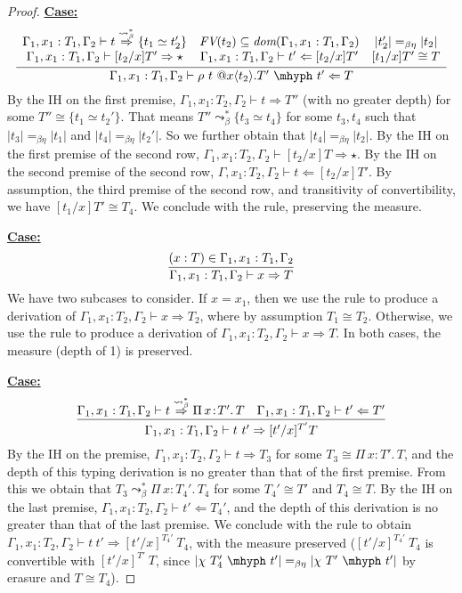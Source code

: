 \documentclass{article}
\newcommand{\abs}[4]{{#1}\, #2\! : \! #3.\, #4}
\newcommand{\tpcheck}[0]{\Leftarrow}
\newcommand{\tpsynth}[0]{\Rightarrow}
\newcommand{\tpsynthleads}[0]{\ensuremath{\overset{\leadsto_\beta^*}{\Rightarrow}}}
\newcommand{\startcase}[1]{\vspace{#1} \noindent\textbf{\underline{Case:}}}
\begin{document}
\begin{proof}
  \startcase{.2cm}
  \[
  \infer{\Gamma_1,x_1:T_1,\Gamma_2 \vdash \rho\ t\ @x\langle t_2 \rangle.T'\ \mhyph\ t' \tpcheck T}
  {
    \begin{array}{ccc}
      \Gamma_1,x_1:T_1,\Gamma_2 \vdash t \tpsynthleads \{t_1 \simeq t_2'\}
      & \textit{FV}(t_2) \subseteq \textit{dom}(\Gamma_1,x_1:T_1,\Gamma_2)
      & |t_2'| =_{\beta\eta} |t_2|
      \\ \Gamma_1,x_1:T_1,\Gamma_2 \vdash [t_2/x] T' \tpsynth \star
      & \Gamma_1,x_1:T_1,\Gamma_2 \vdash t' \tpcheck [t_2/x]T'
      & [t_1/x]T' \cong T
    \end{array}
  }
  \]
  By the IH on the first premise, \(\Gamma_1,x_1:T_2,\Gamma_2 \vdash t \tpsynth
  T''\) (with no greater depth) for some \(T'' \cong \{t_1 \simeq t_2'\}\).
  That means \(T'' \leadsto_\beta^* \{t_3 \simeq t_4\}\) for some \(t_3,t_4\)
  such that \(|t_3| =_{\beta\eta} |t_1|\) and \(|t_4| =_{\beta\eta} |t_2'|\).
  So we further obtain that \(|t_4| =_{\beta\eta} |t_2|\).
  By the IH on the first premise of the second row, \(\Gamma_1,x_1:T_2,\Gamma_2
  \vdash [t_2/x]T \tpsynth \star\).
  By the IH on the second premise of the second row, \(\Gamma,x_1:T_2,\Gamma_2
  \vdash t \tpcheck [t_2/x]T'\).
  By assumption, the third premise of the second row, and transitivity of
  convertibility, we have \([t_1/x]T' \cong T_4\).
  We conclude with the rule, preserving the measure.
  
  \startcase{.2cm}
  \[
    \infer{
      \Gamma_1,x_1:T_1,\Gamma_2 \vdash x \tpsynth T
    }{
      (x : T)\in\Gamma_1,x_1:T_1,\Gamma_2
    }
  \]
  We have two subcases to consider.
  If \(x = x_1\), then we use the rule to produce a derivation of
  \(\Gamma_1,x_1:T_2,\Gamma_2 \vdash x \tpsynth T_2\), where by assumption \(T_1 \cong T_2\).
  Otherwise, we use the rule to produce a derivation of
  \(\Gamma_1,x_1:T_2,\Gamma_2 \vdash x \tpsynth T\).
  In both cases, the measure (depth of 1) is preserved.

  \startcase{.2cm}
  \[
    \infer{
      \Gamma_1,x_1:T_1,\Gamma_2 \vdash t\ t' \tpsynth [t'/x]^{T'}T
    }{
      \Gamma_1,x_1:T_1,\Gamma_2 \vdash t \tpsynthleads \abs{\Pi}{x}{T'}{T}
      & \Gamma_1,x_1:T_1,\Gamma_2 \vdash t' \tpcheck T'
    }
  \]
  By the IH on the premise, \(\Gamma_1,x_1:T_2,\Gamma_2 \vdash t \tpsynth T_3\)
  for some \(T_3 \cong \abs{\Pi}{x}{T'}{T}\), and the depth of this typing
  derivation is no greater than that of the first premise.
  From this we obtain that \(T_3 \leadsto^*_\beta \abs{\Pi}{x}{T_4'}{T_4}\) for
  some \(T_4' \cong T'\) and \(T_4 \cong T\).
  By the IH on the last premise, \(\Gamma_1,x_1:T_2,\Gamma_2 \vdash t' \tpcheck
  T_4'\), and the depth of this derivation is no greater than that of the last premise.
  We conclude with the rule to obtain \(\Gamma_1,x_1:T_2,\Gamma_2 \vdash t\ t'
  \tpsynth [t'/x]^{T_4'}\ T_4\), with the measure preserved (\([t'/x]^{T_4'}\
  T_4\) is convertible with \([t'/x]^{T'}\ T\), since \(|\chi\ T_4'\ \mhyph\ t'|
  =_{\beta\eta} |\chi\ T'\ \mhyph\ t'|\) by erasure and \(T \cong T_4\)).


\end{proof}
\end{document}
